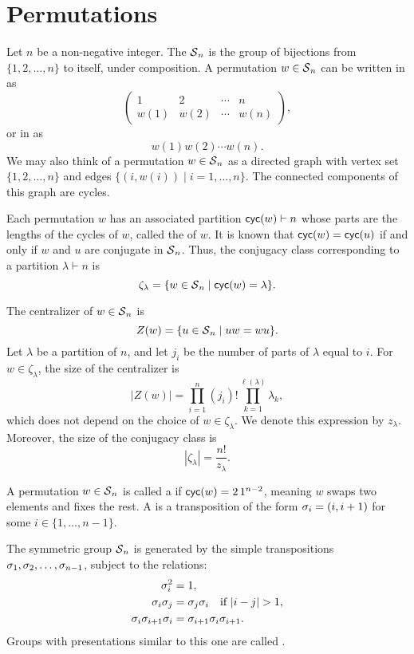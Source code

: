 \chapter{Permutations}

Let \(n\) be a non-negative integer.
The  \(\operatorname{\mathcal{S}}_n\)
is the group of bijections from \(\{1, 2, \ldots, n\}\) to itself,
under composition.
A permutation \(w \in \operatorname{\mathcal{S}}_n\) can be written in  as
\[
    \begin{pmatrix}
        1    & 2    & \cdots & n    \\
        w(1) & w(2) & \cdots & w(n)
    \end{pmatrix},
\]
or in  as
\[
    w(1)w(2)\cdots w(n).
\]
We may also think of a permutation \(w \in \operatorname{\mathcal{S}}_n\) as a directed graph with vertex set \(\{1, 2, \ldots, n\}\) and edges \(\{(i, w(i)) \mid i = 1, \ldots, n\}\). The connected components of this graph are cycles.


Each permutation \(w\) has an associated partition \(\operatorname{\mathsf{cyc}}(w) \vdash n\) whose parts are the lengths of the cycles of \(w\), called the  of \(w\). It is known that \(\operatorname{\mathsf{cyc}}(w) = \operatorname{\mathsf{cyc}}(u)\) if and only if \(w\) and \(u\) are conjugate in \(\operatorname{\mathcal{S}}_n\). Thus, the conjugacy class corresponding to a partition \(\lambda \vdash n\) is
\[
    \zeta_\lambda = \{ w \in \operatorname{\mathcal{S}}_n \mid \operatorname{\mathsf{cyc}}(w) = \lambda \}.
\]

The centralizer of \(w \in \operatorname{\mathcal{S}}_n\) is
\[
    Z(w) = \{ u \in \operatorname{\mathcal{S}}_n \mid uw = wu \}.
\]
Let \(\lambda\) be a partition of \(n\), and let \(j_i\) be the number of parts of \(\lambda\) equal to \(i\). For \(w \in \zeta_\lambda\), the size of the centralizer is
\[
    |Z(w)| = \prod_{i=1}^n (j_i)! \prod_{k=1}^{\ell(\lambda)} \lambda_k,
\]
which does not depend on the choice of \(w \in \zeta_\lambda\). We denote this expression by \(z_\lambda\). Moreover, the size of the conjugacy class is
\[
    |\zeta_\lambda| = \frac{n!}{z_\lambda}.
\]

A permutation \(w \in \operatorname{\mathcal{S}}_n\) is called a  if \(\operatorname{\mathsf{cyc}}(w) = 2\,1^{n-2}\), meaning \(w\) swaps two elements and fixes the rest. A  is a transposition of the form \(\sigma_{i} = (i, i+1)\) for some \(i \in \{1, \ldots, n-1\}\).

The symmetric group \(\operatorname{\mathcal{S}}_n\) is generated by the simple transpositions \(\sigma_{1}, \sigma_{2}, \ldots, \sigma_{n-1}\), subject to the relations:
\begin{align*}
    \sigma_{i}^2                 & = 1,                                           \\
    \sigma_{i}\sigma_{j}           & = \sigma_{j}\sigma_{i} \quad \text{if } |i-j| > 1, \\
    \sigma_{i}\sigma_{i+1}\sigma_{i} & = \sigma_{i+1}\sigma_{i}\sigma_{i+1}.
\end{align*}
Groups with presentations similar to this one are called .

